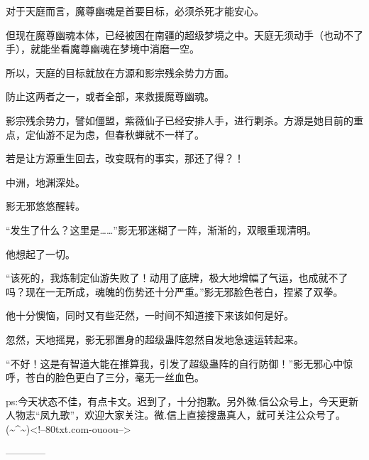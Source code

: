 \begin{this_body}
对于天庭而言，魔尊幽魂是首要目标，必须杀死才能安心。

但现在魔尊幽魂本体，已经被困在南疆的超级梦境之中。天庭无须动手（也动不了手），就能坐看魔尊幽魂在梦境中消磨一空。

所以，天庭的目标就放在方源和影宗残余势力方面。

防止这两者之一，或者全部，来救援魔尊幽魂。

影宗残余势力，譬如僵盟，紫薇仙子已经安排人手，进行剿杀。方源是她目前的重点，定仙游不足为虑，但春秋蝉就不一样了。

若是让方源重生回去，改变既有的事实，那还了得？！

中洲，地渊深处。

影无邪悠悠醒转。

“发生了什么？这里是……”影无邪迷糊了一阵，渐渐的，双眼重现清明。

他想起了一切。

“该死的，我炼制定仙游失败了！动用了底牌，极大地增幅了气运，也成就不了吗？现在一无所成，魂魄的伤势还十分严重。”影无邪脸色苍白，捏紧了双拳。

他十分懊恼，同时又有些茫然，一时间不知道接下来该如何是好。

忽然，天地摇晃，影无邪置身的超级蛊阵忽然自发地急速运转起来。

“不好！这是有智道大能在推算我，引发了超级蛊阵的自行防御！”影无邪心中惊呼，苍白的脸色更白了三分，毫无一丝血色。

ps:今天状态不佳，有点卡文。迟到了，十分抱歉。另外微.信公众号上，今天更新人物志“凤九歌”，欢迎大家关注。微.信上直接搜蛊真人，就可关注公众号了。(\~{}\^{}\~{})<!--80txt.com-ouoou-->

------------

\end{this_body}

